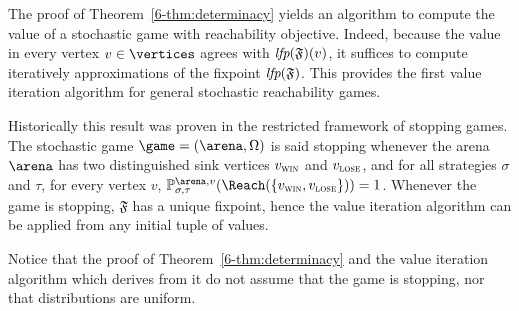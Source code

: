 The proof of Theorem~\ref{6-thm:determinacy} yields an algorithm to
compute the value of a stochastic game with reachability
objective. Indeed, because the value in every vertex $v \in \vertices$
agrees with $\textit{lfp}(\mathfrak{F})(v)$, it suffices to compute
iteratively approximations of the fixpoint $\textit{lfp}(\mathfrak{F})$.  This
provides the first value iteration algorithm for general stochastic
reachability games.

Historically this result was proven in the restricted framework of
stopping games. The stochastic game $\game = (\arena,\Omega)$ is said
stopping whenever the arena $\arena$ has two distinguished sink
vertices $v_{\textsc{win}}$ and $v_{\textsc{lose}}$, and for all strategies $\sigma$ and
$\tau$, for every vertex $v$,
$\probm_{\sigma,\tau}^{\arena,v}(\Reach(\{\vwin,\vlose\})) =
1$. Whenever the game is stopping, $\mathfrak{F}$ has a unique
fixpoint, hence the value iteration algorithm can be applied from any
initial tuple of values.



Notice that the proof of Theorem~\ref{6-thm:determinacy} and the value
iteration algorithm which derives from it do not assume that the game
is stopping, nor that distributions are uniform.
